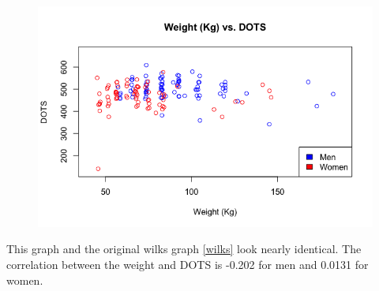 \documentclass[10pt,letterpaper]{article}
\begin{document}
    \begin{figure}[H]
        \center
        \includegraphics[width=35em]{weightVSdots.png}
        \label{dots}
    \end{figure}
    This graph and the original wilks graph \ref{wilks} look nearly identical. The correlation between the weight and DOTS is -0.202 for men and 0.0131 for women.  
\end{document}
